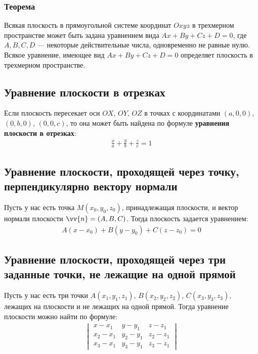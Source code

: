 \documentclass[a4paper,12pt,oneside]{extbook}
\theoremstyle{numbered}
\theoremstyle{unnumbered}
\theoremstyle{named}
\theoremstyle{unnumbered}
\theoremstyle{named}
\theoremstyle{named}
\theoremstyle{named}
\begin{document}
\subsubsection{Теорема}
Всякая плоскость в прямоугольной системе координат \(Oxyz\) в трехмерном пространстве может быть задана уравнением вида \(Ax + By + Cz + D = 0\), где \(A, B, C, D\) — некоторые действительные числа, одновременно не равные нулю. Всякое уравнение, имеющее вид \(Ax + By + Cz + D = 0\) определяет плоскость в трехмерном пространстве.


\subsection{Уравнение плоскости в отрезках}
Если плоскость пересекает оси \(OX\), \(OY\), \(OZ\) в точках с координатами \((a, 0, 0)\), \((0, b, 0)\), \((0, 0, c)\), то она может быть найдена по формуле \textbf{уравнения плоскости в отрезках}:
\begin{gather*}
    \frac{x}{a} + \frac{y}{b} + \frac{z}{c} = 1
\end{gather*}


\subsection{Уравнение плоскости, проходящей через точку, перпендикулярно вектору нормали}
Пусть у нас есть точка \(M(x_0, y_0, z_0)\), принадлежащая плоскости, и вектор нормали плоскости \(\vv{n} = (A, B, C)\). Тогда плоскость задается уравнением:
\begin{gather*}
    A(x - x_0) + B(y - y_0) + C(z - z_0) = 0
\end{gather*}


\subsection{Уравнение плоскости, проходящей через три заданные точки, не лежащие на одной прямой}
Пусть у нас есть три точки \(A(x_1, y_1, z_1)\), \(B(x_2, y_2, z_2)\), \(C(x_3, y_3, z_3)\), лежащих на плоскости и не лежащих на одной прямой. Тогда уравнение плоскости можно найти по формуле:
\begin{gather*}
    \begin{vmatrix}
        x - x_1   & y - y_1   & z - z_1   \\
        x_2 - x_1 & y_2 - y_1 & z_2 - z_1 \\
        x_3 - x_1 & y_3 - y_1 & z_3 - z_1
    \end{vmatrix}
\end{gather*}
\end{document}
